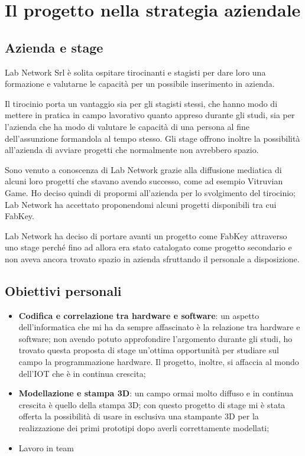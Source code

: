 
\chapter{Il progetto nella strategia aziendale}
\label{cap:processi-metodologie}

\section{Azienda e stage}
Lab Network Srl è solita ospitare tirocinanti e stagisti per dare loro una formazione e valutarne le capacità per un possibile inserimento in azienda.

Il tirocinio porta un vantaggio sia per gli stagisti stessi, che hanno modo di mettere in pratica in campo lavorativo quanto appreso durante gli studi, sia per l'azienda che ha modo di valutare le capacità di una persona al fine dell'assunzione formandola al tempo stesso. Gli stage offrono inoltre la possibilità all'azienda di avviare progetti che normalmente non avrebbero spazio. 

Sono venuto a conoscenza di Lab Network grazie alla diffusione mediatica di alcuni loro progetti che stavano avendo successo, come ad esempio Vitruvian Game. Ho deciso quindi di propormi all'azienda per lo svolgimento del tirocinio; Lab Network ha accettato proponendomi alcuni progetti disponibili tra cui FabKey.

Lab Network ha deciso di portare avanti un progetto come FabKey attraverso uno stage perché fino ad allora era stato catalogato come progetto secondario e non aveva ancora trovato spazio in azienda sfruttando il personale a disposizione.


\section{Obiettivi personali}
\begin{itemize}
\item \textbf{Codifica e correlazione tra hardware e software}: un aspetto dell'informatica che mi ha da sempre affascinato è la relazione tra hardware e software; non avendo potuto approfondire l'argomento durante gli studi, ho trovato questa proposta di stage un'ottima opportunità per studiare sul campo la programmazione hardware. Il progetto, inoltre, si affaccia al mondo dell'IOT che è in continua crescita;
\item \textbf{Modellazione e stampa 3D}: un campo ormai molto diffuso e in continua crescita è quello della stampa 3D; con questo progetto di stage mi è stata offerta la possibilità di usare in esclusiva una stampante 3D per la realizzazione dei primi prototipi dopo averli correttamente modellati;
\item Lavoro in team
\end{itemize}

